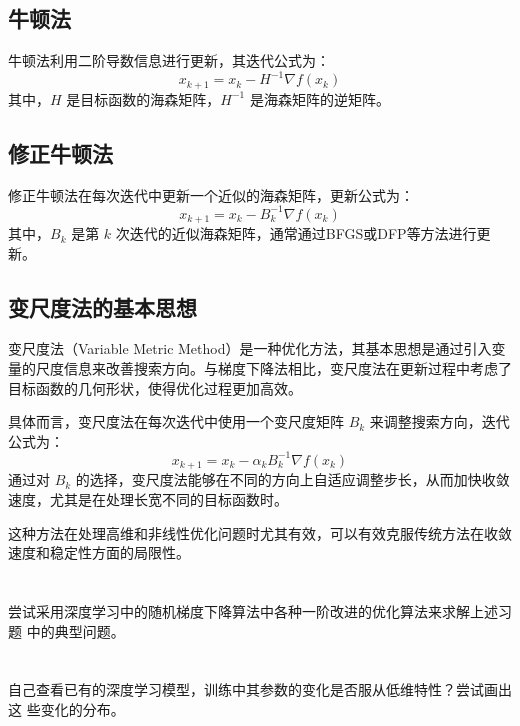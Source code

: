 \documentclass[a4paper]{article}
\begin{document}
\subsection{牛顿法}

牛顿法利用二阶导数信息进行更新，其迭代公式为：
\[
x_{k+1} = x_k - H^{-1} \nabla f(x_k)
\]
其中，$H$ 是目标函数的海森矩阵，$H^{-1}$ 是海森矩阵的逆矩阵。

\subsection{修正牛顿法}

修正牛顿法在每次迭代中更新一个近似的海森矩阵，更新公式为：
\[
x_{k+1} = x_k - B_k^{-1} \nabla f(x_k)
\]
其中，$B_k$ 是第 $k$ 次迭代的近似海森矩阵，通常通过BFGS或DFP等方法进行更新。

\subsection{变尺度法的基本思想}

变尺度法（Variable Metric Method）是一种优化方法，其基本思想是通过引入变量的尺度信息来改善搜索方向。与梯度下降法相比，变尺度法在更新过程中考虑了目标函数的几何形状，使得优化过程更加高效。

具体而言，变尺度法在每次迭代中使用一个变尺度矩阵 $B_k$ 来调整搜索方向，迭代公式为：
\[
x_{k+1} = x_k - \alpha_k B_k^{-1} \nabla f(x_k)
\]
通过对 $B_k$ 的选择，变尺度法能够在不同的方向上自适应调整步长，从而加快收敛速度，尤其是在处理长宽不同的目标函数时。

这种方法在处理高维和非线性优化问题时尤其有效，可以有效克服传统方法在收敛速度和稳定性方面的局限性。


\section{}

尝试采用深度学习中的随机梯度下降算法中各种一阶改进的优化算法来求解上述习题
中的典型问题。

\section{}

自己查看已有的深度学习模型，训练中其参数的变化是否服从低维特性？尝试画出这
些变化的分布。

\section{}
\end{document}
